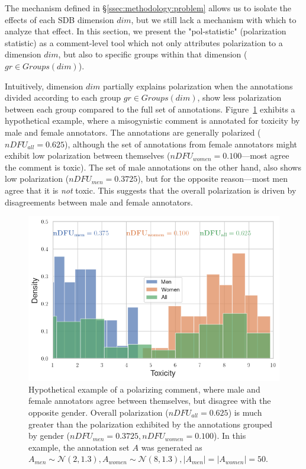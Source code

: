 \documentclass{article}
\newcommand{\sdbdim}{\textit{dim}}
\newcommand{\sdbgroup}{\textit{gr}}
\newcommand{\Sdbgroup}{\textit{Groups}}
\begin{document}
The mechanism defined in \S\ref{ssec:methodology:problem} allows us to isolate the effects of each \ac{SDB} dimension $\sdbdim$, but we still lack a mechanism with which to analyze that effect. In this section, we present the "pol-statistic" (polarization statistic) as a comment-level tool which not only attributes polarization to a dimension $\sdbdim$, but also to specific groups within that dimension ($\sdbgroup \in \Sdbgroup(\sdbdim)$).

Intuitively, dimension $\sdbdim$ partially explains polarization when the annotations divided according to each group $\sdbgroup \in \Sdbgroup(\sdbdim)$, show less polarization between each group compared to the full set of annotations. Figure~\ref{fig:ndfu_single_comment} exhibits a hypothetical example, where a misogynistic comment is annotated for toxicity by male and female annotators. The annotations are generally polarized ($nDFU_{all} = 0.625$), although the set of annotations from female annotators might exhibit low polarization between themselves ($nDFU_{women} = 0.100$---most agree the comment is toxic). The set of male annotations on the other hand, also shows low polarization ($nDFU_{men} = 0.3725$), but for the opposite reason---most men agree that it is \emph{not} toxic. This suggests that the overall polarization is driven by disagreements between male and female annotators. 

\begin{figure}[t]
	\centering
	\includegraphics[width=0.8\linewidth]{ndfu_single_comment.png}
	\caption{Hypothetical example of a polarizing comment, where male and female annotators agree between themselves, but disagree with the opposite gender. Overall polarization ($nDFU_{all} = 0.625$) is much greater than the polarization exhibited by the annotations grouped by gender ($nDFU_{men} = 0.3725, nDFU_{women} = 0.100$). In this example, the annotation set $A$ was generated as $A_{men} \sim \mathcal{N}(2, 1.3), A_{women} \sim \mathcal{N}(8, 1.3), \lvert A_{men} \rvert = \lvert A_{women} \rvert = 50$.}
	\label{fig:ndfu_single_comment}
\end{figure}
\end{document}
